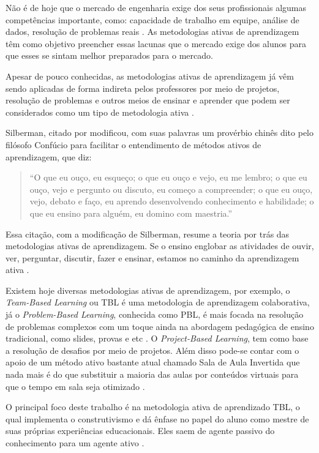 Não é de hoje que o mercado de engenharia exige dos seus profissionais algumas competências importante, como: capacidade de trabalho em equipe, análise de dados, resolução de problemas reais \cite{davis}. As metodologias ativas de aprendizagem têm como objetivo preencher essas lacunas que o mercado exige dos alunos para que esses se sintam melhor preparados para o mercado.

Apesar de pouco conhecidas, as metodologias ativas de aprendizagem já vêm sendo aplicadas de forma indireta pelos professores por meio de projetos, resolução de problemas e outros meios de ensinar e aprender que podem ser considerados como um tipo de metodologia ativa \cite{moran}.

Silberman, citado por \cite{barbosa} modificou, com suas palavras um provérbio chinês dito pelo filósofo Confúcio para facilitar o entendimento de métodos ativos de aprendizagem, que diz:

\begin{quote}
“O que eu ouço, eu esqueço; o que eu ouço e vejo, eu me lembro; o que eu ouço, vejo e pergunto ou discuto, eu começo a compreender; o que eu ouço, vejo, debato e faço, eu aprendo desenvolvendo conhecimento e habilidade; o que eu ensino para alguém, eu domino com maestria.”
\end{quote}

Essa citação, com a modificação de Silberman, resume a teoria por trás das metodologias ativas de aprendizagem. Se o ensino englobar as atividades de ouvir, ver,  perguntar, discutir, fazer e ensinar, estamos no caminho da aprendizagem ativa \cite{barbosa}.

Existem hoje diversas metodologias ativas de aprendizagem, por exemplo, o \textit{Team-Based Learning} ou TBL é uma metodologia de aprendizagem colaborativa, já o \textit{Problem-Based Learning}, conhecida como PBL, é mais focada na resolução de problemas complexos com um toque ainda na abordagem pedagógica de ensino tradicional, como slides, provas e etc \cite{cabrera}. O \textit{Project-Based Learning}, tem como base a resolução de desafios por meio de projetos. Além disso pode-se contar com o apoio de um método ativo bastante atual chamado Sala de Aula Invertida que nada mais é  do que substituir a maioria das aulas por conteúdos virtuais para que o tempo em sala seja otimizado \cite{moran}.

O principal foco deste trabalho é na metodologia ativa de aprendizado TBL, o qual  implementa o construtivismo e dá ênfase no papel do aluno como mestre de suas próprias experiências educacionais. Eles saem de agente passivo do conhecimento para um agente ativo \cite{gomez}.

